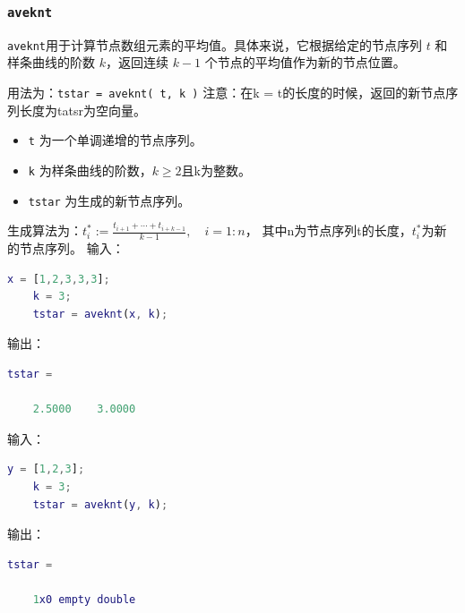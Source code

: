 \subsubsection{\texttt{aveknt}}

\texttt{aveknt}用于计算节点数组元素的平均值。具体来说，它根据给定的节点序列 $t$ 和样条曲线的阶数 $k$，返回连续 $k-1$ 个节点的平均值作为新的节点位置。

用法为：\texttt{tstar = aveknt( t, k )}
注意：在k = t的长度的时候，返回的新节点序列长度为tatsr为空向量。
\begin{itemize}
    \item \texttt{t} 为一个单调递增的节点序列。
    \item \texttt{k} 为样条曲线的阶数，$k \geq 2$且k为整数。
    \item \texttt{tstar} 为生成的新节点序列。
\end{itemize}
生成算法为：$t_{i}^{*} := \frac{t_{i+1} + \cdots + t_{i+k-1}}{k-1}, \quad i = 1:n$， 其中n为节点序列t的长度，$t_{i}^{*}$为新的节点序列。
输入：
\begin{lstlisting}[language = matlab]
    x = [1,2,3,3,3];
    k = 3;
    tstar = aveknt(x, k);
\end{lstlisting}
输出：
\begin{lstlisting}[language = matlab]
    tstar = 

    2.5000    3.0000
\end{lstlisting}

输入：
\begin{lstlisting}[language = matlab]
    y = [1,2,3];
    k = 3;
    tstar = aveknt(y, k);
\end{lstlisting}
输出：
\begin{lstlisting}[language = matlab]
    tstar = 

    1x0 empty double

\end{lstlisting}

